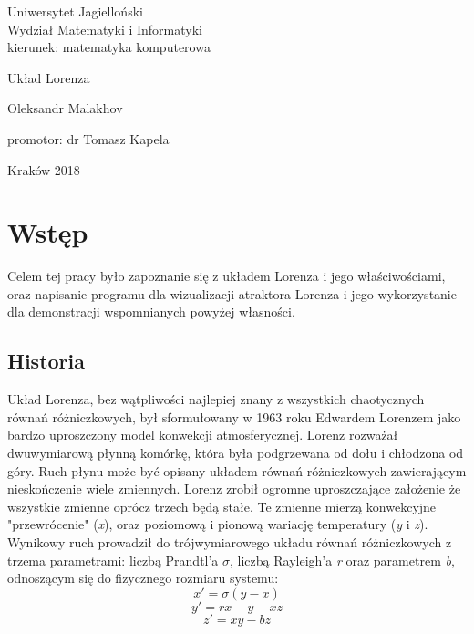 \documentclass[12pt]{report}
\begin{document}
\begin{titlepage}
	\begin{center}
	\large 
	Uniwersytet Jagielloński\\
	Wydział Matematyki i Informatyki\\
	kierunek: matematyka komputerowa
	
	\vspace{5.0cm}
	\huge
	Układ Lorenza
	
	\vspace{1.0cm}
	\large
	Oleksandr Malakhov
	\end{center}
	
	\vspace{3.0cm}
	\begin{flushright}
	promotor: dr Tomasz Kapela
	\end{flushright}
	
	\vspace{4.0cm}
	\begin{center}
		\footnotesize
		Kraków 2018
	\end{center}
\end{titlepage}

\tableofcontents

\chapter{Wstęp}
	\par Celem tej pracy było zapoznanie się z układem Lorenza i jego właściwościami, oraz napisanie programu dla wizualizacji atraktora Lorenza i jego wykorzystanie dla demonstracji wspomnianych powyżej własności.

	\section{Historia}
	\par Układ Lorenza, bez wątpliwości najlepiej znany z wszystkich chaotycznych równań różniczkowych, był sformułowany w 1963 roku Edwardem Lorenzem jako bardzo uproszczony model konwekcji atmosferycznej. Lorenz rozważał dwuwymiarową płynną komórkę, która była podgrzewana od dołu i chłodzona od góry. Ruch płynu może być opisany układem równań różniczkowych zawierającym nieskończenie wiele zmiennych. Lorenz zrobił ogromne uproszczające założenie że wszystkie zmienne oprócz trzech będą stałe. Te zmienne mierzą konwekcyjne "przewrócenie" (\textit{x}), oraz poziomową i pionową wariację temperatury (\textit{y} i \textit{z}). Wynikowy ruch  prowadził do trójwymiarowego układu równań różniczkowych z trzema parametrami: liczbą Prandtl'a $\sigma$, liczbą Rayleigh'a \textit{r} oraz parametrem \textit{b}, odnoszącym się do fizycznego rozmiaru systemu:
		\[ x' = \sigma (y - x) \]
		\[ y' = rx - y - xz \]
		\[ z' = xy - bz \]
\end{document}
